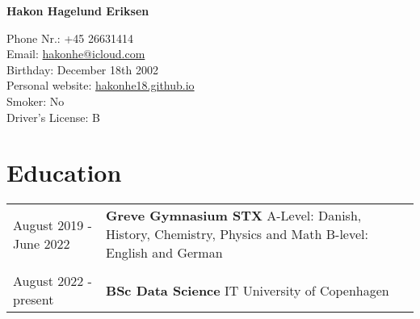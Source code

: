 \documentclass[12pt]{article}
\begin{document}
\begin{center}
     \Huge{\textbf{Hakon Hagelund Eriksen}}
\end{center}
Phone Nr.: \hfill +45 26631414\\
Email:  \hfill \href{mailto:hakonhe@icloud.com}{hakonhe@icloud.com} \\ 
Birthday: \hfill December 18th 2002 \\
Personal website: \hfill \href{hakonhe18.github.io}{hakonhe18.github.io} \\
Smoker: \hfill No \\
Driver's License: \hfill B


\section{Education}
\begin{tabular}{ l p{6in} }
August 2019 -  June 2022 & \textbf{Greve Gymnasium STX } \newline A-Level: Danish, History, Chemistry, Physics and Math \newline B-level: English and German \\
& \\
August 2022 - present & \textbf{BSc Data Science} \newline IT University of Copenhagen \\ 
\end{tabular}
\end{document}
